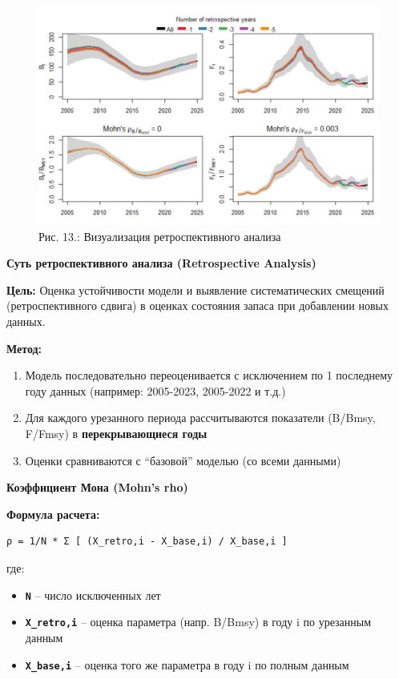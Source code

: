\documentclass[
  letterpaper,
  DIV=11,
  numbers=noendperiod]{scrreprt}
\begin{document}
\begin{figure}[H]

{\centering \includegraphics[width=0.8\linewidth,height=\textheight,keepaspectratio]{images/SPICT13.PNG}

}

\caption{Рис. 13.: Визуализация ретроспективного анализа}

\end{figure}%

\textbf{Суть ретроспективного анализа (Retrospective Analysis)}

\textbf{Цель:} Оценка устойчивости модели и выявление систематических
смещений (ретроспективного сдвига) в оценках состояния запаса при
добавлении новых данных.

\textbf{Метод:}

\begin{enumerate}
\def\labelenumi{\arabic{enumi}.}
\item
  Модель последовательно переоценивается с исключением по 1 последнему
  году данных (например: 2005-2023, 2005-2022 и т.д.)
\item
  Для каждого урезанного периода рассчитываются показатели (B/Bmsy,
  F/Fmsy) в \textbf{перекрывающиеся годы}
\item
  Оценки сравниваются с ``базовой'' моделью (со всеми данными)
\end{enumerate}

\textbf{Коэффициент Мона (Mohn's rho)}

\textbf{Формула расчета:}

\begin{verbatim}
ρ = 1/N * Σ [ (X_retro,i - X_base,i) / X_base,i ]
\end{verbatim}

где:

\begin{itemize}
\item
  \textbf{\texttt{N}} -- число исключенных лет
\item
  \textbf{\texttt{X\_retro,i}} -- оценка параметра (напр. B/Bmsy) в году
  i по урезанным данным
\item
  \textbf{\texttt{X\_base,i}} -- оценка того же параметра в году i по
  полным данным
\end{itemize}
\end{document}
